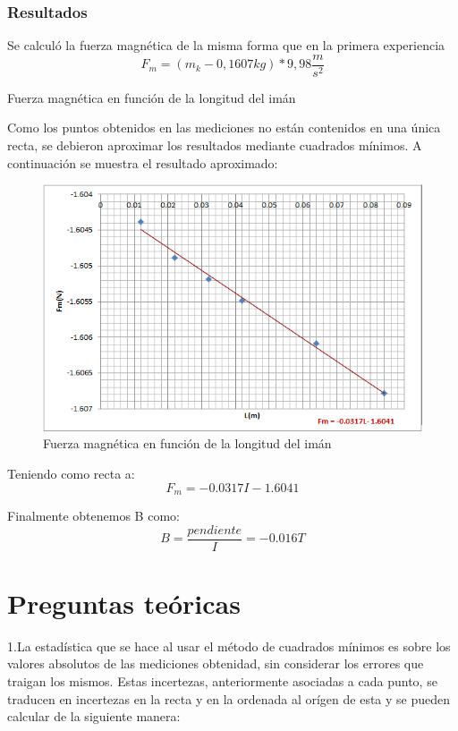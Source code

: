 \documentclass{article}
\begin{document}
\subsubsection{Resultados}
Se calculó la fuerza magnética de la misma forma que en la primera experiencia
\begin{equation}
F_m = (m_k - 0,1607kg)*9,98\frac{m}{s^2}
\end{equation}

\begin{table}[ht]
\centering

\caption{Fuerza magnética en función de la longitud del imán}
\end{table}

Como los puntos obtenidos en las mediciones no están contenidos en una única recta, se debieron aproximar los resultados mediante cuadrados mínimos. A 
continuación se muestra el resultado aproximado:

\begin{figure}[H]
\centering
\includegraphics[width=\columnwidth]{recta_segunda_experiencia.png}
\caption{Fuerza magnética en función de la longitud del imán}
\end{figure}

Teniendo como recta a:
\begin{equation}
F_{m} = -0.0317 I - 1.6041
\end{equation}

Finalmente obtenemos B como:
\begin{equation}
B = \frac{pendiente}{I} = -0.016 T
\end{equation}

\section{Preguntas teóricas} %
1.La estadística que se hace al usar el método de cuadrados mínimos es sobre los valores absolutos de las mediciones obtenidad, sin considerar los errores que traigan los mismos. Estas incertezas, anteriormente asociadas a cada punto, se traducen en incertezas en la recta y en la ordenada al orígen de esta y se pueden calcular de la siguiente manera:
\end{document}
